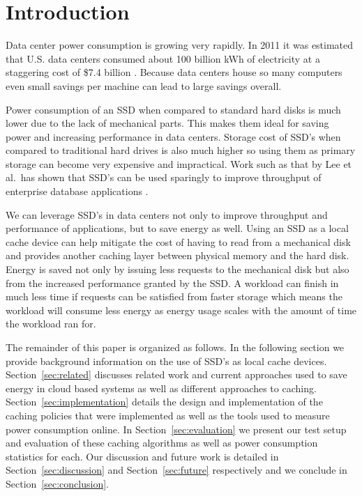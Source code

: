 \section{Introduction}

Data center power consumption is growing very rapidly. In 2011 it was estimated
that U.S. data centers consumed about 100 billion kWh of electricity at a
staggering cost of \$7.4 billion \cite{data-center-power}. Because data centers
house so many computers even small savings per machine can lead to large
savings overall.

Power consumption of an SSD when compared to standard hard disks is much lower
due to the lack of mechanical parts. This makes them ideal for saving power and
increasing performance in data centers. Storage cost of SSD's when compared to
traditional hard drives is also much higher so using them as primary storage can
become very expensive and impractical. Work such as that by Lee et al.\ has
shown that SSD's can be used sparingly to improve throughput of enterprise
database applications \cite{enterprise-ssd}.

We can leverage SSD's in data centers not only to improve throughput and
performance of applications, but to save energy as well. Using an SSD as a local
cache device can help mitigate the cost of having to read from a mechanical disk
and provides another caching layer between physical memory and the hard
disk. Energy is saved not only by issuing less requests to the mechanical disk
but also from the increased performance granted by the SSD. A workload can
finish in much less time if requests can be satisfied from faster storage which
means the workload will consume less energy as energy usage scales with the
amount of time the workload ran for.

The remainder of this paper is organized as follows. In the following section we
provide background information on the use of SSD's as local cache
devices. Section~\ref{sec:related} discusses related work and current approaches
used to save energy in cloud based systems as well as different approaches to
caching. Section~\ref{sec:implementation} details the design and implementation
of the caching policies that were implemented as well as the tools used to
measure power consumption online. In Section~\ref{sec:evaluation} we present our
test setup and evaluation of these caching algorithms as well as power
consumption statistics for each. Our discussion and future work is detailed in
Section~\ref{sec:discussion} and Section~\ref{sec:future} respectively and we
conclude in Section~\ref{sec:conclusion}.
